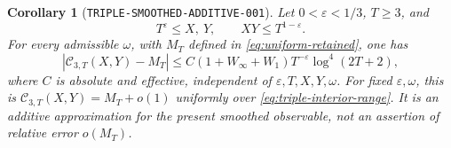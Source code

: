\documentclass[11pt]{article}
\newtheorem{corollary}[lemma]{Corollary}
\newcommand{\CT}{\mathcal C_{3,T}}
\begin{document}
\begin{corollary}[\texttt{TRIPLE-SMOOTHED-ADDITIVE-001}]
\label{cor:triple-smoothed-additive}
Let \(0<\varepsilon<1/3\), \(T\geq3\), and
\begin{equation}\label{eq:triple-interior-range}
 T^\varepsilon\leq X,\ Y,\qquad XY\leq T^{1-\varepsilon}.
\end{equation}
For every admissible \(\omega\), with \(M_T\) defined in
\eqref{eq:uniform-retained}, one has
\begin{equation}\label{eq:triple-additive}
 |\CT(X,Y)-M_T|
 \leq C(1+W_\infty+W_1)T^{-\varepsilon}\log^4(2T+2),
\end{equation}
where \(C\) is absolute and effective, independent of
\(\varepsilon,T,X,Y,\omega\).
For fixed \(\varepsilon,\omega\), this is
\(\CT(X,Y)=M_T+o(1)\) uniformly over \eqref{eq:triple-interior-range}.
It is an additive approximation for the present smoothed observable,
not an assertion of relative error \(o(M_T)\).
\end{corollary}
\end{document}
